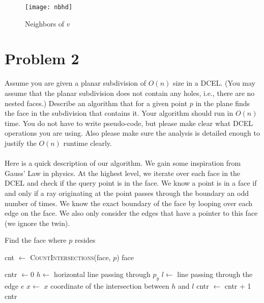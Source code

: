\documentclass[11pt]{article}
\begin{document}
\begin{figure}[h]
   \centering
   \texttt{[image: nbhd]}
   \caption{Neighbors of $v$}
   \label{fig:neighbors}
\end{figure}

\newpage
\section*{Problem 2}

Assume you are given a planar subdivision of $O(n)$ size in a DCEL. (You may
assume that the planar subdivision does not contain any holes, i.e., there are
no nested faces.) Describe an algorithm that for a given point $p$ in the plane
finds the face in the subdivision that contains it. Your algorithm should run in
$O(n)$ time. You do not have to write pseudo-code, but please make clear what
DCEL operations you are using. Also please make sure the analysis is detailed
enough to justify the $O(n)$ runtime clearly. \\\\
\answer
Here is a quick description of our algorithm.
We gain some inspiration from Gauss' Law in physics.
At the highest level, we iterate over each face in the DCEL and check if the query point is in the face.
We know a point is in a face if and only if a ray originating at the point passes through the boundary an odd number of times.
We know the exact boundary of the face by looping over each edge on the face.
We also only consider the edges that have a pointer to this face (we ignore the twin).

\begin{algorithm}
\caption{Find the face where $p$ resides}
    \label{alg:findface}
    \begin{algorithmic}[1]
            \State cnt $\gets$ \textsc{CountIntersections}(face, $p$)
                \State \Return face
            \EndIf
        \EndFor
    \EndFunction
    \end{algorithmic}

    \begin{algorithmic}[1]
        \State cntr $\gets 0$
        \State $h \gets$ horizontal line passing through $p_y$
            \State $l \gets$ line passing through the edge $e$
            \State $x \gets$ $x$ coordinate of the intersection between $h$ and $l$
                \State cntr $\gets$ cntr + 1
            \EndIf
        \EndFor
        \State \Return cntr
    \EndFunction
    \end{algorithmic}
\end{algorithm}
\end{document}
